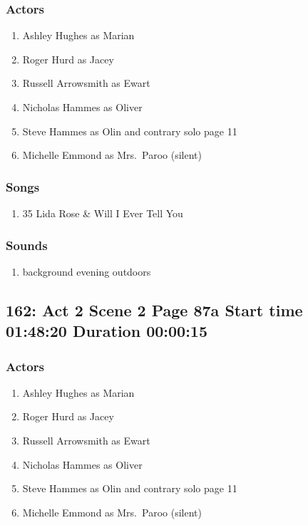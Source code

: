 \subsubsection{Actors}
\begin{enumerate}
\item Ashley Hughes as Marian
\item Roger Hurd as Jacey
\item Russell Arrowsmith as Ewart
\item Nicholas Hammes as Oliver
\item Steve Hammes as Olin and contrary solo page 11
\item Michelle Emmond as Mrs.~Paroo (silent)
\end{enumerate}

\subsubsection{Songs}
\begin{enumerate}
\item 35 Lida Rose \& Will I Ever Tell You
\end{enumerate}\subsubsection{Sounds}
\begin{enumerate}
\item background evening outdoors
\end{enumerate}
\subsection{162: Act 2 Scene 2 Page 87a Start time 01:48:20 Duration 00:00:15}

\subsubsection{Actors}
\begin{enumerate}
\item Ashley Hughes as Marian
\item Roger Hurd as Jacey
\item Russell Arrowsmith as Ewart
\item Nicholas Hammes as Oliver
\item Steve Hammes as Olin and contrary solo page 11
\item Michelle Emmond as Mrs.~Paroo (silent)
\end{enumerate}

